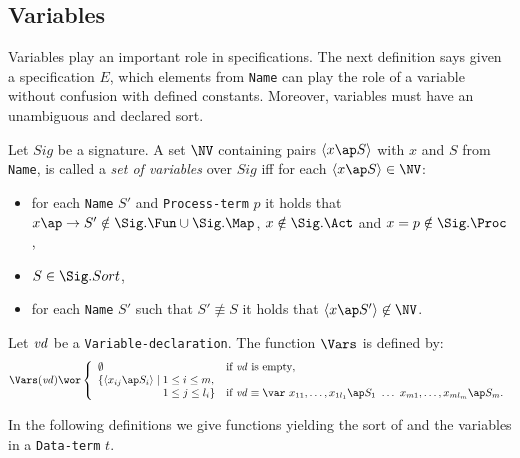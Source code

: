 \documentclass[twoside,fleqn,a4paper,dvips]{article}
\begin{document}
\subsection{Variables}
Variables play an important role in specifications. The next definition
says given a specification $E$, which elements from {\tt Name} can play the
role of a variable without confusion with
defined constants. Moreover, variables must have an unambiguous and
declared sort.
\begin{Dn}
Let $Sig$ be a signature. A set $\NV$ containing 
pairs
$\langle x\ap S\rangle$ with $x$ and $S$ from {\tt Name}, 
is called a {\it set of variables} over $Sig$ iff for each $\langle
x\ap S\rangle\in \NV$:
\begin{itemize}
\item
for each {\tt Name} $S'$ and {\tt Process-term} $p$ it holds that
$x\ap \rightarrow S'\notin \Sig.\Fun\cup\Sig.\Map$, 
$x\notin\Sig.\Act$ and $x=p\notin\Sig.\Proc$,
\item
$S\in \Sig.Sort$,
\item
for each {\tt Name} $S'$ such that $S'\not\equiv S$ it holds
that $\langle x\ap S'\rangle\not\in \NV$.
\end{itemize}
\end{Dn}
\begin{Dn}
\newcommand{\vd}{{\it vd}}
Let $\vd$ be a {\tt Variable-declaration}.
The function $\Vars$ is defined by:
\[\Vars(\vd)\wor\left\{
\begin{array}{ll}
\emptyset&\mbox{if $\vd$ is empty},\\
\{\langle x_{ij}\ap S_i\rangle\mid 1\leq i\leq m,\\
\phantom{\{\langle x_i\ap S_{ij}\rangle\mid }\hspace*{1mm}1\leq j\leq
l_i\}&
\mbox{if}~\vd\equiv
\var~x_{11},\ldots,x_{1l_1}\ap  S_1~\ldots~x_{m1},\ldots,x_{ml_m}\ap S_m.
\end{array}\right.\]
\end{Dn}
In the following definitions we give functions yielding the sort of and the 
variables in a
{\tt Data-term} $t$. 
\end{document}
